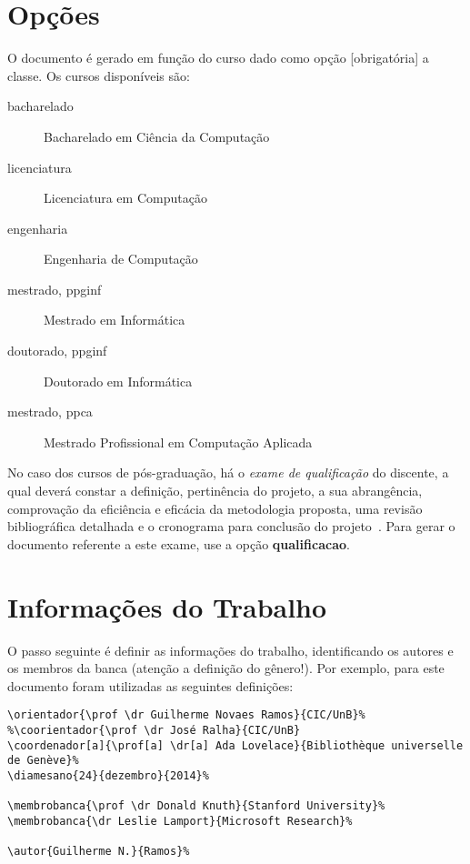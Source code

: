 \section{Opções}
O documento é gerado em função do curso dado como opção [obrigatória] a classe.
Os cursos disponíveis são:
\begin{description}
  \item[bacharelado] Bacharelado em Ciência da Computação
  \item[licenciatura] Licenciatura em Computação
  \item[engenharia] Engenharia de Computação
  \item[mestrado, ppginf] Mestrado em Informática
  \item[doutorado, ppginf] Doutorado em Informática
  \item[mestrado, ppca] Mestrado Profissional em Computação Aplicada
\end{description}

No caso dos cursos de pós-graduação, há o \emph{exame de qualificação} do
discente, a qual deverá constar a definição, pertinência do projeto, a sua
abrangência, comprovação da eficiência e eficácia da metodologia proposta, uma
revisão bibliográfica detalhada e o cronograma para conclusão do projeto~\cite{ppginf}.
Para gerar o documento referente a este exame, use a opção \textbf{qualificacao}.

\section{Informações do Trabalho}%
O passo seguinte é definir as informações do trabalho, identificando os autores
e os membros da banca (atenção a definição do gênero!). Por exemplo, para este
documento foram utilizadas as seguintes definições:

\begin{verbatim}
\orientador{\prof \dr Guilherme Novaes Ramos}{CIC/UnB}%
%\coorientador{\prof \dr José Ralha}{CIC/UnB}
\coordenador[a]{\prof[a] \dr[a] Ada Lovelace}{Bibliothèque universelle de Genève}%
\diamesano{24}{dezembro}{2014}%

\membrobanca{\prof \dr Donald Knuth}{Stanford University}%
\membrobanca{\dr Leslie Lamport}{Microsoft Research}%

\autor{Guilherme N.}{Ramos}%
\end{verbatim}


